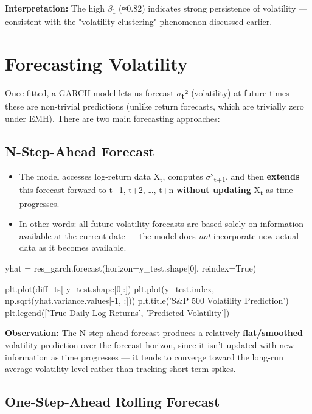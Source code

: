 \documentclass[12pt,openany]{book}
\theoremstyle{definition}
\theoremstyle{remark}
\begin{document}
\textbf{Interpretation:} The high \ensuremath{\beta}\textsubscript{1} (≈0.82) indicates strong persistence of volatility — consistent with the "volatility clustering" phenomenon discussed earlier.


\section{Forecasting Volatility}

Once fitted, a GARCH model lets us forecast \textbf{\ensuremath{\sigma}\textsubscript{t}²} (volatility) at future times — these are non-trivial predictions (unlike return forecasts, which are trivially zero under EMH). There are two main forecasting approaches:

\subsection{N-Step-Ahead Forecast}

\begin{itemize}
\item The model accesses log-return data X\textsubscript{t}, computes \ensuremath{\sigma}²\textsubscript{t}\textsubscript{+}\textsubscript{1}, and then \textbf{extends} this forecast forward to t+1, t+2, …, t+n \textbf{without updating} X\textsubscript{t} as time progresses.
\item In other words: all future volatility forecasts are based solely on information available at the current date — the model does \emph{not} incorporate new actual data as it becomes available.
\end{itemize}

\begin{python}
yhat = res_garch.forecast(horizon=y_test.shape[0], reindex=True)

plt.plot(diff_ts[-y_test.shape[0]:])
plt.plot(y_test.index, np.sqrt(yhat.variance.values[-1, :]))
plt.title('S&P 500 Volatility Prediction')
plt.legend(['True Daily Log Returns', 'Predicted Volatility'])
\end{python}

\textbf{Observation:} The N-step-ahead forecast produces a relatively \textbf{flat/smoothed} volatility prediction over the forecast horizon, since it isn't updated with new information as time progresses — it tends to converge toward the long-run average volatility level rather than tracking short-term spikes.

\subsection{One-Step-Ahead Rolling Forecast}
\end{document}
